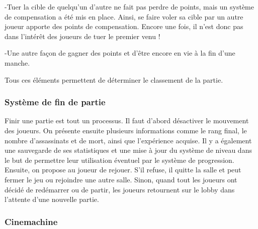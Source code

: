 	-Tuer la cible de quelqu'un d'autre ne fait pas perdre de points, mais un système de compensation a été mis en place. Ainsi, se faire voler sa cible par un autre joueur apporte des points de compensation. Encore une fois, il n'est donc pas dans l'intérêt 
	des joueurs de tuer le premier venu !

	-Une autre façon de gagner des points et d'être encore en vie à la fin d'une manche.

    Tous ces éléments permettent de déterminer le classement de la partie.
	
\subsubsection{Système de fin de partie}
	Finir une partie est tout un processus. Il faut d'abord désactiver le mouvement des joueurs.
	On présente ensuite plusieurs informations comme le rang final, le nombre d'assassinats
	et de mort, ainsi que l'expérience acquise. Il y a également une sauvegarde de ses statistiques et une mise à jour du système
	de niveau dans le but de permettre leur utilisation éventuel par le système de progression.
	Ensuite, on propose au joueur de rejouer. S'il refuse, il quitte la salle et peut fermer le jeu ou rejoindre une autre salle.
	Sinon, quand tout les joueurs ont décidé de redémarrer ou de partir, les joueurs retournent 
	sur le lobby dans l'attente d'une nouvelle partie.

\subsubsection{Cinemachine}
